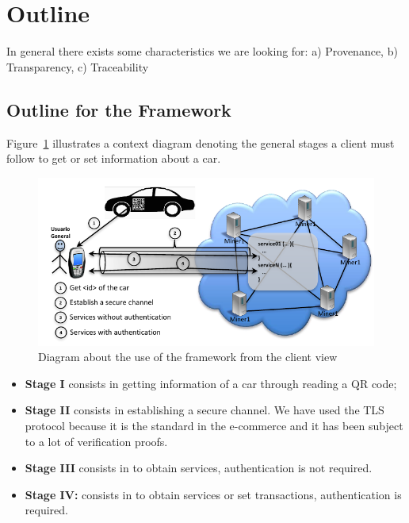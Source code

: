\section{Outline}
\label{sec:outline}


In general there exists some characteristics we are looking for:
a) Provenance,
b) Transparency,
c) Traceability

\subsection{Outline for the Framework}
\label{subsec:proposal}
Figure~\ref{fig:flowChartFramework} illustrates a context diagram denoting
the general stages a client must follow to get or set information about a car. 
\begin{figure}[bt]
  \centering
    \includegraphics[scale=0.7]{images/gralScheme.pdf}
        \caption{Diagram about the use of the framework from the client view}
    \label{fig:flowChartFramework}
\end{figure}

\begin{itemize}
  \item \textbf{Stage I} consists in getting information of a car through reading
    a QR code;
  \item \textbf{Stage II} consists in establishing a secure channel. We
    have used the TLS protocol because it is the standard in the
    e-commerce and it has been subject to a lot of verification proofs.  
  \item \textbf{Stage III} consists in to obtain services, authentication
    is not required.   
  \item \textbf{Stage IV:} consists in to obtain services or set transactions, 
    authentication is required.  
\end{itemize}

